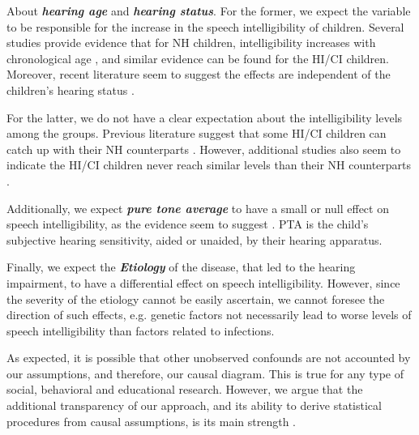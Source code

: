 About \textbf{\textit{hearing age}} and \textbf{\textit{hearing status}}. For the former, we expect the variable to be responsible for the increase in the speech intelligibility of children. Several studies provide evidence that for NH children, intelligibility increases with chronological age \cite{Chin_et_al_2001, Chin_et_al_2003, Flipsen_2006, Flipsen_2008, Baudonck_et_al_2009, Bowen_2011, Hustad_et_al_2020}, and similar evidence can be found for the HI/CI children. Moreover, recent literature seem to suggest the effects are independent of the children's hearing status \cite{Boonen_et_al_2021}. 

For the latter, we do not have a clear expectation about the intelligibility levels among the groups. Previous literature suggest that some HI/CI children can catch up with their NH counterparts \cite{Wie_2010, Habib_et_al_2010, Boons_et_al_2013, Geers_et_al_2013, Bruijnzeel_et_al_2016, Dettman_et_al_2016, Wie_et_al_2020}. However, additional studies also seem to indicate the HI/CI children never reach similar levels than their NH counterparts \cite{Nicholas_et_al_2007, Castellanos_et_al_2014, Chin_et_al_2014, Geers_et_al_2016, Freeman_et_al_2017, Duchesne_et_al_2019, Grandon_et_al_2020}. 

Additionally, we expect \textbf{\textit{pure tone average}} to have a small or null effect on speech intelligibility, as the evidence seem to suggest \cite{Boonen_et_al_2021}. PTA is the child's subjective hearing sensitivity, aided or unaided, by their hearing apparatus.

Finally, we expect the \textbf{\textit{Etiology}} of the disease, that led to the hearing impairment, to have a differential effect on speech intelligibility. However, since the severity of the etiology cannot be easily ascertain, we cannot foresee the direction of such effects, e.g. genetic factors not necessarily lead to worse levels of speech intelligibility than factors related to infections.

As expected, it is possible that other unobserved confounds are not accounted by our assumptions, and therefore, our causal diagram. This is true for any type of social, behavioral and educational research. However, we argue that the additional transparency of our approach, and its ability to derive statistical procedures from causal assumptions, is its main strength \cite{McElreath_2020, Yarkoni_2020, Rohrer_et_al_2021}.
%
%

